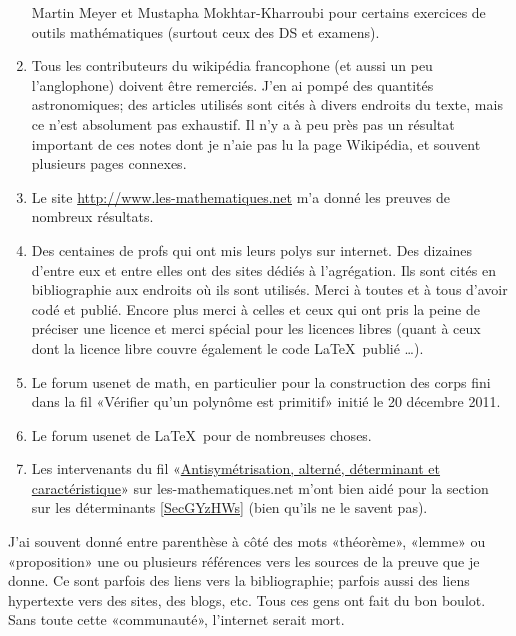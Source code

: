 \begin{enumerate}
        Martin Meyer et Mustapha Mokhtar-Kharroubi pour certains exercices de outils mathématiques (surtout ceux des DS et examens).
    \item
        Tous les contributeurs du wikipédia francophone (et aussi un peu l'anglophone) doivent être remerciés. J'en ai pompé des quantités astronomiques; des articles utilisés sont cités à divers endroits du texte, mais ce n'est absolument pas exhaustif. Il n'y a à peu près pas un résultat important de ces notes dont je n'aie pas lu la page Wikipédia, et souvent plusieurs pages connexes.
    \item
        Le site \url{http://www.les-mathematiques.net} m'a donné les preuves de nombreux résultats.
    \item
        Des centaines de profs qui ont mis leurs polys sur internet. Des dizaines d'entre eux et entre elles ont des sites dédiés à l'agrégation. Ils sont cités en bibliographie aux endroits où ils sont utilisés. Merci à toutes et à tous d'avoir codé et publié. Encore plus merci à celles et ceux qui ont pris la peine de préciser une licence et merci spécial pour les licences libres (quant à ceux dont la licence libre couvre également le code \LaTeX\ publié \ldots).
    \item
        Le forum usenet de math, en particulier pour la construction des corps fini dans la fil «Vérifier qu'un polynôme est primitif» initié le 20 décembre 2011.
    \item
        Le forum usenet de \LaTeX\ pour de nombreuses choses.
    \item
        Les intervenants du fil «\href{http://www.les-mathematiques.net/phorum/read.php?2,302266}{Antisymétrisation, alterné, déterminant et caractéristique}» sur les-mathematiques.net m'ont bien aidé pour la section sur les déterminants \ref{SecGYzHWs} (bien qu'ils ne le savent pas).
\end{enumerate}

J'ai souvent donné entre parenthèse à côté des mots «théorème», «lemme» ou «proposition» une ou plusieurs références vers les sources de la preuve que je donne. Ce sont parfois des liens vers la bibliographie; parfois aussi des liens hypertexte vers des sites, des blogs, etc. Tous ces gens ont fait du bon boulot. Sans toute cette «communauté», l'internet serait mort.

